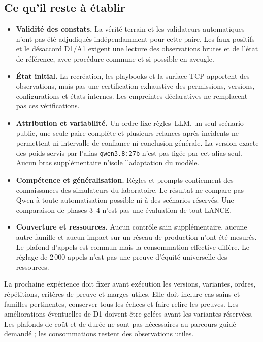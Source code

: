 \documentclass[11pt,a4paper]{article}
\newcommand{\code}[1]{\nolinkurl{#1}}
\begin{document}
\subsection{Ce qu'il reste à établir}
\begin{itemize}
\item \textbf{Validité des constats.} La vérité terrain et les validateurs
automatiques n'ont pas été adjudiqués indépendamment pour cette paire. Les
faux positifs et le désaccord D1/A1 exigent une lecture des observations brutes
et de l'état de référence, avec procédure commune et si possible en aveugle.
\item \textbf{État initial.} La recréation, les playbooks et la surface TCP
apportent des observations, mais pas une certification exhaustive des permissions,
versions, configurations et états internes. Les empreintes déclaratives ne
remplacent pas ces vérifications.
\item \textbf{Attribution et variabilité.} Un ordre fixe règles--LLM, un seul
scénario public, une seule paire complète et plusieurs relances après incidents
ne permettent ni intervalle de confiance ni conclusion générale. La version
exacte des poids servis par l'alias \code{qwen3.8:27b} n'est pas figée par cet
alias seul. Aucun bras supplémentaire n'isole l'adaptation du modèle.
\item \textbf{Compétence et généralisation.} Règles et prompts contiennent
des connaissances des simulateurs du laboratoire. Le résultat ne compare pas
Qwen à toute automatisation possible ni à des scénarios réservés. Une
comparaison de phases 3--4 n'est pas une évaluation de tout LANCE.
\item \textbf{Couverture et ressources.} Aucun contrôle sain supplémentaire,
aucune autre famille et aucun impact sur un réseau de production n'ont été
mesurés. Le plafond d'appels est commun mais la consommation effective diffère.
Le réglage de 2\,000 appels n'est pas une preuve d'équité universelle des ressources.
\end{itemize}

La prochaine expérience doit fixer avant exécution les versions, variantes,
ordres, répétitions, critères de preuve et marges utiles. Elle doit inclure cas
sains et familles pertinentes, conserver tous les échecs et faire relire les
preuves. Les améliorations éventuelles de D1 doivent être gelées avant les
variantes réservées. Les plafonds de coût et de durée ne sont pas nécessaires
au parcours guidé demandé ; les consommations restent des observations utiles.
\end{document}
